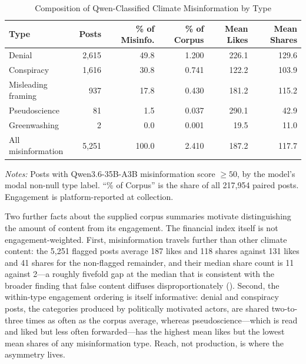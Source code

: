 \documentclass{article}
\theoremstyle{plain}
\begin{document}
\begin{table}[!ht]
\centering
\caption{Composition of Qwen-Classified Climate Misinformation by Type}
\label{tab:qwen_type}
\begin{threeparttable}
\begin{tabularx}{\textwidth}{l R R R R R}
\toprule
Type & Posts & \% of Misinfo. & \% of Corpus & Mean Likes & Mean Shares \\
\midrule
Denial & 2,615 & 49.8 & 1.200 & 226.1 & 129.6 \\
Conspiracy & 1,616 & 30.8 & 0.741 & 122.2 & 103.9 \\
Misleading framing & 937 & 17.8 & 0.430 & 181.2 & 115.2 \\
Pseudoscience & 81 & 1.5 & 0.037 & 290.1 & 42.9 \\
Greenwashing & 2 & 0.0 & 0.001 & 19.5 & 11.0 \\
\midrule
All misinformation & 5,251 & 100.0 & 2.410 & 187.2 & 117.7 \\
\bottomrule
\end{tabularx}
\begin{tablenotes}\small
\item \textit{Notes:} Posts with Qwen3.6-35B-A3B misinformation score $\geq 50$, by the model's modal non-null type label. ``\% of Corpus'' is the share of all 217,954 paired posts. Engagement is platform-reported at collection.
\end{tablenotes}
\end{threeparttable}
\end{table}

Two further facts about the supplied corpus summaries motivate distinguishing the amount of content from its engagement. The financial index itself is not engagement-weighted. First, misinformation travels further than other climate content: the 5,251 flagged posts average 187 likes and 118 shares against 131 likes and 41 shares for the non-flagged remainder, and their median share count is 11 against 2---a roughly fivefold gap at the median that is consistent with the broader finding that false content diffuses disproportionately (\cite{VosoughiRoyAral2018}). Second, the within-type engagement ordering is itself informative: denial and conspiracy posts, the categories produced by politically motivated actors, are shared two-to-three times as often as the corpus average, whereas pseudoscience---which is read and liked but less often forwarded---has the highest mean likes but the lowest mean shares of any misinformation type. Reach, not production, is where the asymmetry lives.
\end{document}
